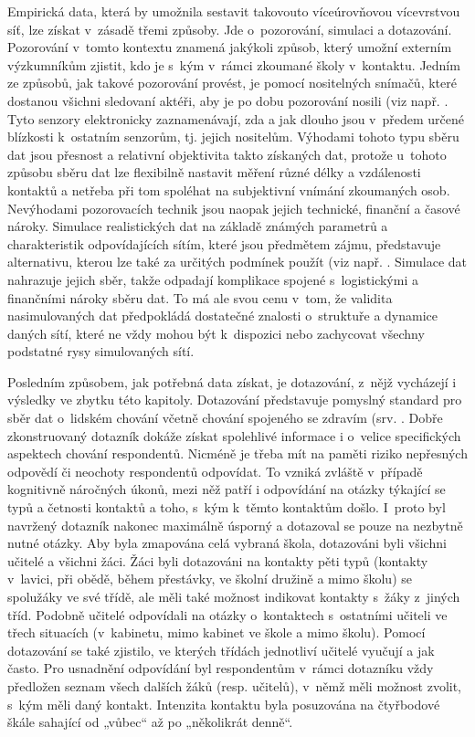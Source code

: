 Empirická data, která by umožnila sestavit takovouto víceúrovňovou vícevrstvou síť, lze získat v~zásadě třemi způsoby. Jde o~pozorování, simulaci a dotazování. Pozorování v~tomto kontextu znamená jakýkoli způsob, který umožní externím výzkumníkům zjistit, kdo je s~kým v~rámci zkoumané školy v~kontaktu. Jedním ze způsobů, jak takové pozorování provést, je pomocí nositelných snímačů, které dostanou všichni sledovaní aktéři, aby je po dobu pozorování nosili (viz např. \cite{stehle2011high, gemmetto2014mitigation}. Tyto senzory elektronicky zaznamenávají, zda a jak dlouho jsou v~předem určené blízkosti k~ostatním senzorům, tj. jejich nositelům. Výhodami tohoto typu sběru dat jsou přesnost a relativní objektivita takto získaných dat, protože u~tohoto způsobu sběru dat lze flexibilně nastavit měření různé délky a vzdálenosti kontaktů a netřeba při tom spoléhat na subjektivní vnímání zkoumaných osob. Nevýhodami pozorovacích technik jsou naopak jejich technické, finanční a časové nároky. Simulace realistických dat na základě známých parametrů a charakteristik odpovídajících sítím, které jsou předmětem zájmu, představuje alternativu, kterou lze také za určitých podmínek použít (viz např. \cite{mcgee2021model, potter2012estimating}. Simulace dat nahrazuje jejich sběr, takže odpadají komplikace spojené s~logistickými a finančními nároky sběru dat. To má ale svou cenu v~tom, že validita nasimulovaných dat předpokládá dostatečné znalosti o~struktuře a dynamice daných sítí, které ne vždy mohou být k~dispozici nebo zachycovat všechny podstatné rysy simulovaných sítí.

Posledním způsobem, jak potřebná data získat, je dotazování, z~nějž vycházejí i výsledky ve zbytku této kapitoly. Dotazování představuje pomyslný standard pro sběr dat o~lidském chování včetně chování spojeného se zdravím (srv. \cite{danon2011networks, luke2007network, zaj:mossong2008social}. Dobře zkonstruovaný dotazník dokáže získat spolehlivé informace i o~velice specifických aspektech chování respondentů. Nicméně je třeba mít na paměti riziko nepřesných odpovědí či neochoty respondentů odpovídat. To vzniká zvláště v~případě kognitivně náročných úkonů, mezi něž patří i odpovídání na otázky týkající se typů a četnosti kontaktů a toho, s~kým k~těmto kontaktům došlo. I~proto byl navržený dotazník nakonec maximálně úsporný a dotazoval se pouze na nezbytně nutné otázky. Aby byla zmapována celá vybraná škola, dotazováni byli všichni učitelé a všichni žáci. Žáci byli dotazováni na kontakty pěti typů (kontakty v~lavici, při obědě, během přestávky, ve školní družině a mimo školu) se spolužáky ve své třídě, ale měli také možnost indikovat kontakty s~žáky z~jiných tříd. Podobně učitelé odpovídali na otázky o~kontaktech s~ostatními učiteli ve třech situacích (v~kabinetu, mimo kabinet ve škole a mimo školu). Pomocí dotazování se také zjistilo, ve kterých třídách jednotliví učitelé vyučují a jak často. Pro usnadnění odpovídání byl respondentům v~rámci dotazníku vždy předložen seznam všech dalších žáků (resp. učitelů), v~němž měli možnost zvolit, s~kým měli daný kontakt. Intenzita kontaktu byla posuzována na čtyřbodové škále sahající od „vůbec“ až po „několikrát denně“.


